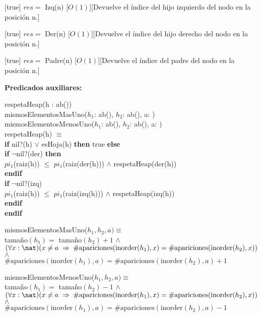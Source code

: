 \documentclass[../main.tex]{subfiles}
\begin{document}
\begin{interfaz}
[true]
{$res =$ Izq(n)}
[$O(1)$][Devuelve el índice del hijo izquierdo del nodo en la posición n.]

[true]
{$res =$ Der(n)}
[$O(1)$][Devuelve el índice del hijo derecho del nodo en la posición n.]

[true]
{$res =$ Padre(n)}
[$O(1)$][Devuelve el índice del padre del nodo en la posición n.]

{\nln\large\bfseries Predicados auxiliares: }

respetaHeap(h : ab(\tupPuesto)) \\
mismosElementosMasUno($h_1$: ab(\tupPuesto), $h_2$: ab(\tupPuesto), a: \tupPuesto) \\
mismosElementosMenosUno($h_1$: ab(\tupPuesto), $h_2$: ab(\tupPuesto), a: \tupPuesto) \\

respetaHeap(h) $\equiv$ \\
\textbf{if} nil?(h) $\lor$ esHoja(h) \textbf{then} true \textbf{else} \\
 \textbf{if} $\neg$nil?(der) \textbf{then} \\
 $pi_1$(raiz(h)) $\leq$ $pi_1$(raiz(der(h))) $\land$ respetaHeap(der(h)) \\
 \textbf{endif} \\
 \textbf{if} $\neg$nil?(izq) \\
 $pi_1$(raiz(h)) $\leq$ $pi_1$(raiz(izq(h))) $\land$ respetaHeap(izq(h)) \\
 \textbf{endif} \\
\textbf{endif}

mismosElementosMasUno($h_1, h_2, a) \equiv$ \\
tamaño$(h_1) =$ tamaño$(h_2) + 1$ $\land$ \\
$(\forall x: \nat) (x \neq a \implies \#\text{apariciones}(\text{inorder}(h_1), x) = \#\text{apariciones}(\text{inorder}(h_2), x))$ $\land$ \\
$\#\text{apariciones}(\text{inorder}(h_1), a) = \#\text{apariciones}(\text{inorder}(h_2), a) + 1$

mismosElementosMenosUno($h_1, h_2, a) \equiv$ \\
tamaño$(h_1) =$ tamaño$(h_2) - 1$ $\land$ \\
$(\forall x: \nat) (x \neq a \implies \#\text{apariciones}(\text{inorder}(h_1), x) = \#\text{apariciones}(\text{inorder}(h_2), x))$ $\land$ \\
$\#\text{apariciones}(\text{inorder}(h_1), a) = \#\text{apariciones}(\text{inorder}(h_2), a) - 1$


\end{interfaz}
\end{document}
